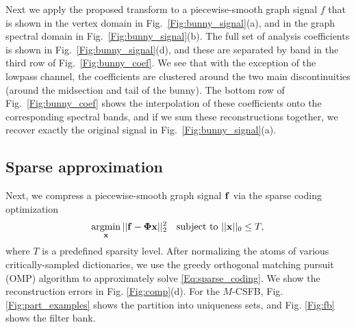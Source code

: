 \documentclass[journal, 10pt]{IEEEtran}
\begin{document}
Next we apply the proposed transform to a piecewise-smooth graph signal $f$ that is shown in the vertex domain in Fig.\ \ref{Fig:bunny_signal}(a), and in the graph spectral domain in Fig.\ \ref{Fig:bunny_signal}(b). The full set of analysis coefficients is shown in Fig.\ \ref{Fig:bunny_signal}(d), and these are separated by band in the third row of Fig.\ \ref{Fig:bunny_coef}. We see that with the exception of the lowpass channel, the coefficients are clustered around the two main discontinuities (around the midsection and tail of the bunny). The bottom row of Fig.\ \ref{Fig:bunny_coef} shows the interpolation of these coefficients onto the corresponding spectral bands, and if we sum these reconstructions together, we recover exactly the original signal in Fig.\ \ref{Fig:bunny_signal}(a).


\subsection{Sparse approximation}
Next, we compress 
a piecewise-smooth graph signal ${\bf f}$ via the sparse coding optimization
\begin{align}\label{Eq:sparse_coding}
\argmin_{\bf x}   || {\bf f}-\boldsymbol{\Phi}{\bf x} ||_2^2 \hbox{~~~subject to } ||{\bf x}||_0 \leq T,
\end{align}
where $T$ is a predefined sparsity level. After %
normalizing the atoms of various critically-sampled dictionaries, we use the greedy %
 orthogonal matching pursuit (OMP) algorithm \cite{tropp2004greed,elad_book} to approximately solve \eqref{Eq:sparse_coding}. 
  We show the reconstruction errors in Fig. \ref{Fig:comp}(d). 
 For the $M$-CSFB, %
 Fig. \ref{Fig:part_examples} shows 
 the partition into uniqueness sets, and  
 Fig. \ref{Fig:fb} shows the filter bank.
\end{document}
